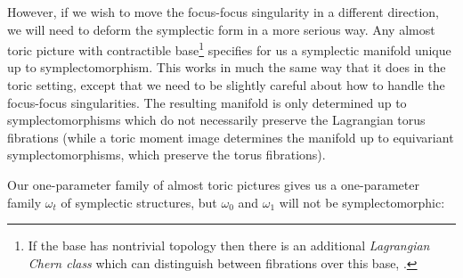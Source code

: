\documentclass{article}
\begin{document}
However, if we wish to move the focus-focus singularity in a different
direction, we will need to deform the symplectic form in a more
serious way. Any almost toric picture with contractible
base\footnote{If the base has nontrivial topology then there is an
additional {\em Lagrangian Chern class} which can distinguish between
fibrations over this base, \cite{Zung}.} specifies for us a symplectic
manifold {\cite[Corollary 5.4]{Symington}} unique up to
symplectomorphism. This works in much the same way that it does in the
toric setting, except that we need to be slightly careful about how to
handle the focus-focus singularities. The resulting manifold is only
determined up to symplectomorphisms which do not necessarily preserve
the Lagrangian torus fibrations (while a toric moment image determines
the manifold up to equivariant symplectomorphisms, which preserve the
torus fibrations).


Our one-parameter family of almost toric pictures gives us a
one-parameter family \(\omega_t\) of symplectic structures, but
\(\omega_0\) and \(\omega_1\) will not be symplectomorphic:
\end{document}
